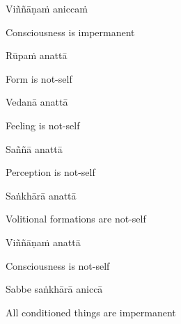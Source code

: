 Viññāṇaṁ aniccaṁ

\begin{english}
    Consciousness is impermanent\makeatletter\hyperlink{endnote19-appendix}\makeatother
\end{english}

Rūpaṁ anattā

\begin{english}
  Form is not-self
\end{english}

Vedanā anattā

\begin{english}
  Feeling is not-self
\end{english}

Saññā anattā

\begin{english}
  Perception is not-self
\end{english}

Saṅkhārā anattā

\begin{english}
    Volitional formations are not-self\makeatletter\hyperlink{endnote20-appendix}\makeatother
\end{english}

Viññāṇaṁ anattā

\begin{english}
    Consciousness is not-self\thinspace\makeatletter\hyperlink{endnote21-appendix}\makeatother
\end{english}

Sabbe saṅkhārā aniccā

\begin{english}
    All conditioned things are impermanent\makeatletter\hyperlink{endnote22-appendix}\makeatother
\end{english}

